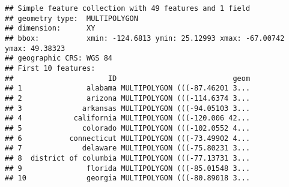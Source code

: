 \documentclass[
]{article}
\begin{document}
\begin{verbatim}
## Simple feature collection with 49 features and 1 field
## geometry type:  MULTIPOLYGON
## dimension:      XY
## bbox:           xmin: -124.6813 ymin: 25.12993 xmax: -67.00742 ymax: 49.38323
## geographic CRS: WGS 84
## First 10 features:
##                      ID                           geom
## 1               alabama MULTIPOLYGON (((-87.46201 3...
## 2               arizona MULTIPOLYGON (((-114.6374 3...
## 3              arkansas MULTIPOLYGON (((-94.05103 3...
## 4            california MULTIPOLYGON (((-120.006 42...
## 5              colorado MULTIPOLYGON (((-102.0552 4...
## 6           connecticut MULTIPOLYGON (((-73.49902 4...
## 7              delaware MULTIPOLYGON (((-75.80231 3...
## 8  district of columbia MULTIPOLYGON (((-77.13731 3...
## 9               florida MULTIPOLYGON (((-85.01548 3...
## 10              georgia MULTIPOLYGON (((-80.89018 3...
\end{verbatim}
\end{document}
